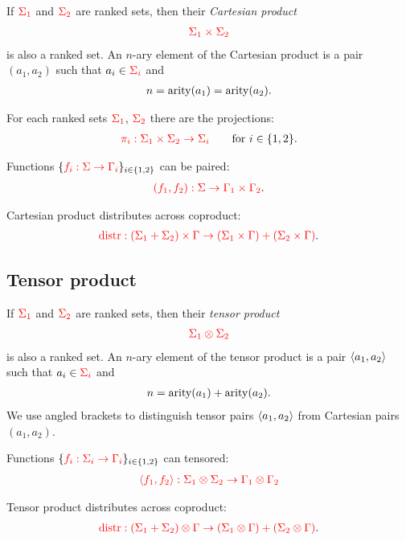 \datatypefigure
{
If ${\color{red}{\Sigma_1}}$ and ${\color{red}{\Sigma_2}}$ are ranked sets, then  their \emph{Cartesian product}
\begin{align*}
    {\color{red}{\Sigma_1 \times \Sigma_2}}
\end{align*}
is also a ranked set. An $n$-ary element of the Cartesian product is a pair $(a_1,a_2)$ such that $a_i \in {\color{red}{\Sigma_i}}$ and 
\begin{align*}
    n = \mathrm{arity}(a_1) = \mathrm{arity}(a_2).
\end{align*}
}
{
       \item For each  ranked sets ${\color{red}{\Sigma_1}}$, ${\color{red}{\Sigma_2}}$ there are the projections:
       \begin{align*}
           {\color{red}{\pi_i : \Sigma_1 \times \Sigma_2  \to \Sigma_i}} \qquad \text{for $i \in \{1,2\}$}.
       \end{align*}
       \item Functions $\{{\color{red}{f_i : \Sigma \to \Gamma_i}}\}_{i \in \{1,2\}}$ can be paired: 
       \begin{align*}
           {\color{red}{{\color{red}{(f_1,f_2)}} : \Sigma \to  \Gamma_1 \times \Gamma_2}}.
       \end{align*}
       \item Cartesian  product distributes across coproduct:
       \begin{align*}
           {\color{red}{{\color{red}{\mathrm{distr}}}: (\Sigma_1 + \Sigma_2)\times \Gamma \to (\Sigma_1 \times \Gamma) + (\Sigma_2 \times \Gamma)}}.
       \end{align*}
}
  
\subsection{Tensor product}

\datatypefigure
{
If ${\color{red}{\Sigma_1}}$ and ${\color{red}{\Sigma_2}}$ are ranked sets, then  their \emph{tensor product}
\begin{align*}
    {\color{red}{\Sigma_1 \otimes \Sigma_2}}
\end{align*}
is also a ranked set. An $n$-ary element of the tensor product is a pair $\langle{a_1,a_2}\rangle$ such that $a_i \in {\color{red}{\Sigma_i}}$ and 
\begin{align*}
    n = \mathrm{arity}(a_1) + \mathrm{arity}(a_2).
\end{align*}
We use angled brackets to distinguish tensor pairs $\langle{a_1,a_2}\rangle$ from Cartesian pairs $(a_1,a_2)$. 
}
{
       \item Functions $\{{\color{red}{f_i : \Sigma_i \to \Gamma_i}}\}_{i \in \{1,2\}}$ can tensored: 
       \begin{align*}
           {\color{red}{{\color{red}{\langle f_1,f_2\rangle}} : \Sigma_1 \otimes \Sigma_2 \to  \Gamma_1 \otimes \Gamma_2}}
       \end{align*}
       \item Tensor  product distributes across coproduct:
       \begin{align*}
           {\color{red}{{\color{red}{\mathrm{distr}}}: (\Sigma_1 + \Sigma_2)\otimes \Gamma \to (\Sigma_1 \otimes \Gamma) + (\Sigma_2 \otimes \Gamma)}}.
       \end{align*} 
}



